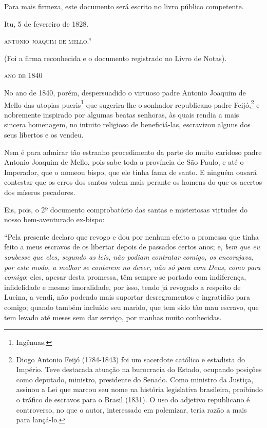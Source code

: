 Para mais firmeza, este documento será escrito no livro público
competente.
\begin{flushright}
Itu, 5 de fevereiro de 1828.

\textsc{antonio joaquim de mello}.''
\end{flushright}
(Foi a firma reconhecida e o documento registrado no Livro de Notas).

\textsc{ano de 1840}

No ano de 1840, porém, despersuadido o virtuoso padre Antonio Joaquim de
Mello das utopias pueris\footnote{Ingênuas.} que sugerira-lhe o
sonhador republicano padre Feijó,\footnote{Diogo Antonio Feijó
  (1784-1843) foi um sacerdote católico e estadista do Império. Teve
  destacada atuação na burocracia do Estado, ocupando posições como
  deputado, ministro, presidente do Senado. Como ministro da Justiça,
  assinou a Lei que marcou seu nome na história legislativa brasileira,
  proibindo o tráfico de escravos para o Brasil (1831). O uso do
  adjetivo republicano é controverso, no que o autor, interessado em
  polemizar, teria razão a mais para lançá-lo.} e nobremente inspirado
por algumas beatas senhoras, às quais rendia a mais sincera homenagem,
no intuito religioso de beneficiá-las, escravizou alguns dos seus
libertos e os vendeu.

Nem é para admirar tão estranho procedimento da parte do muito caridoso
padre Antonio Joaquim de Mello, pois sabe toda a província de São Paulo,
e até o Imperador, que o nomeou bispo, que ele tinha fama de santo. E
ninguém ousará contestar que os erros dos santos valem mais perante os
homens do que os acertos dos míseros pecadores.

Eis, pois, o 2º documento comprobatório das santas e misteriosas
virtudes do nosso bem-aventurado ex-bispo:

``Pela presente declaro que revogo e dou por nenhum efeito a promessa que
tinha feito a meus escravos de os libertar depois de passados certos
anos; e, \emph{bem que eu soubesse que eles, segundo as leis, não podiam
contratar comigo, os encorajava, por este modo, a melhor se conterem no
dever, não só para com Deus, como para comigo}; eles, apesar desta
promessa, têm sempre se portado com indiferença, infidelidade e mesmo
imoralidade, por isso, tendo já revogado a respeito de Lucina, a vendi,
não podendo mais suportar desregramentos e ingratidão para comigo;
quando também incluído seu marido, que tem sido tão mau escravo, que tem
levado até meses sem dar serviço, por manhas muito conhecidas.

